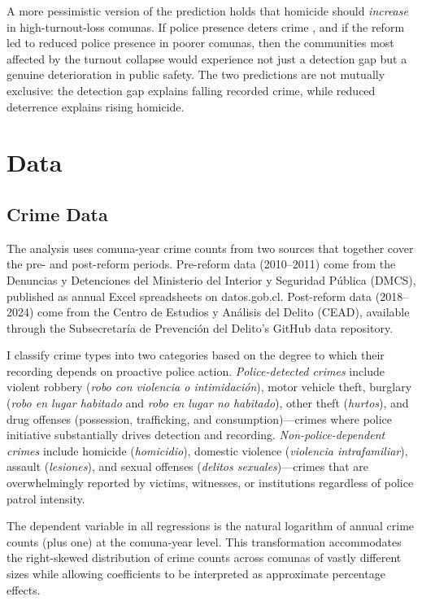 \documentclass[12pt]{article}
\begin{document}
A more pessimistic version of the prediction holds that homicide should \textit{increase} in high-turnout-loss comunas. If police presence deters crime \citep{DiTella2004}, and if the reform led to reduced police presence in poorer comunas, then the communities most affected by the turnout collapse would experience not just a detection gap but a genuine deterioration in public safety. The two predictions are not mutually exclusive: the detection gap explains falling recorded crime, while reduced deterrence explains rising homicide.


\section{Data}\label{sec:data}

\subsection{Crime Data}

The analysis uses comuna-year crime counts from two sources that together cover the pre- and post-reform periods. Pre-reform data (2010--2011) come from the Denuncias y Detenciones del Ministerio del Interior y Seguridad P\'{u}blica (DMCS), published as annual Excel spreadsheets on datos.gob.cl. Post-reform data (2018--2024) come from the Centro de Estudios y An\'{a}lisis del Delito (CEAD), available through the Subsecretar\'{i}a de Prevenci\'{o}n del Delito's GitHub data repository.

I classify crime types into two categories based on the degree to which their recording depends on proactive police action. \textit{Police-detected crimes} include violent robbery (\textit{robo con violencia o intimidaci\'{o}n}), motor vehicle theft, burglary (\textit{robo en lugar habitado} and \textit{robo en lugar no habitado}), other theft (\textit{hurtos}), and drug offenses (possession, trafficking, and consumption)---crimes where police initiative substantially drives detection and recording. \textit{Non-police-dependent crimes} include homicide (\textit{homicidio}), domestic violence (\textit{violencia intrafamiliar}), assault (\textit{lesiones}), and sexual offenses (\textit{delitos sexuales})---crimes that are overwhelmingly reported by victims, witnesses, or institutions regardless of police patrol intensity.

The dependent variable in all regressions is the natural logarithm of annual crime counts (plus one) at the comuna-year level. This transformation accommodates the right-skewed distribution of crime counts across comunas of vastly different sizes while allowing coefficients to be interpreted as approximate percentage effects.
\end{document}
